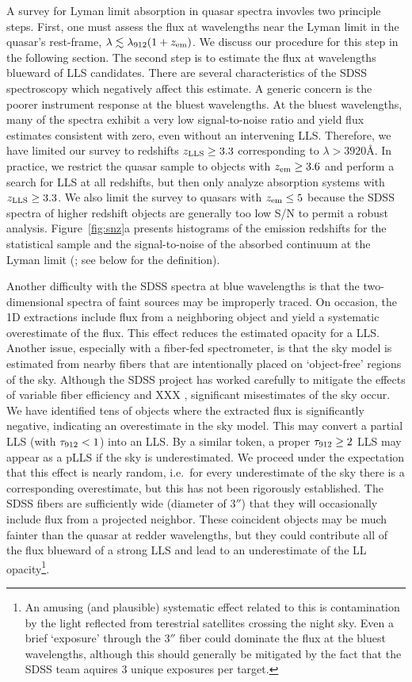 \documentclass[12pt,preprint]{aastex}
\begin{document}
A survey for  Lyman limit absorption in quasar spectra
invovles two principle steps.  First, one must assess
the flux at wavelengths near the Lyman limit
in the quasar's rest-frame, $\lambda \lesssim \lambda_{\rm 912}(1+z_{\rm em})$.  
We discuss our procedure for this step in the following section.  
The second step is to 
estimate the flux at wavelengths blueward of LLS candidates.
There are several characteristics of the SDSS spectroscopy which
negatively affect this estimate.  A generic concern is the poorer instrument
response at the bluest wavelengths.  At the bluest wavelengths,
many of the spectra exhibit a very low signal-to-noise ratio 
and yield flux estimates consistent with zero, even without an
intervening LLS.
Therefore, we have limited our survey to redshifts $z_{\rm LLS} \ge 3.3$
corresponding to $\lambda > 3920$\AA.
In practice, we restrict the quasar sample to objects with
$z_{\rm em} \ge 3.6$ and perform a search for LLS
at all redshifts, but then only analyze absorption systems with
$z_{\rm LLS} \ge 3.3$.  We also limit the survey to quasars with
$z_{\rm em} \le 5$ because the SDSS spectra of higher redshift objects
are generally too low S/N to permit a robust analysis.
Figure~\ref{fig:snz}a presents histograms of the emission redshifts
for the statistical sample and the signal-to-noise of the
absorbed continuum at the Lyman limit
(\sna; see below for the definition).


Another difficulty with the SDSS spectra at blue wavelengths
is that the two-dimensional spectra of faint sources may be improperly traced.
On occasion, the 1D extractions
include flux from a neighboring object and yield a systematic 
overestimate of the flux.  This effect reduces the estimated opacity
for a LLS.  
Another issue, especially with a fiber-fed spectrometer, is that
the sky model is estimated from nearby fibers that are intentionally
placed on `object-free' regions of the sky.  Although the SDSS
project has worked carefully to mitigate the effects of variable
fiber efficiency and XXX \cite{skysub},  significant misestimates 
of the sky occur.  
We have identified tens of objects where the extracted
flux is significantly negative, indicating an overestimate
in the sky model.  
This may convert a partial LLS (with $\tau_{\rm 912} < 1$) into
an LLS.  By a similar token, a proper $\tau_{\rm 912} \ge 2$ LLS may
appear as a pLLS if the sky is underestimated.
We proceed under the expectation that this effect
is nearly random, i.e.\ for every underestimate of the sky there
is a corresponding overestimate, but this has not been rigorously
established.  
The SDSS fibers are sufficiently wide
(diameter of $3''$) that they will occasionally include flux
from a projected neighbor.  These coincident objects may be
much fainter than the quasar at redder wavelengths, but they
could contribute all of the flux blueward of a strong LLS
and lead to an underestimate of the LL opacity\footnote{An amusing
(and plausible) systematic effect related to this is contamination
by the light reflected from terestrial satellites crossing the night sky.  
Even a brief `exposure' through the 3$''$ fiber could dominate the
flux at the bluest wavelengths, although this should generally be
mitigated by the fact that the SDSS team aquires 
3 unique exposures per target.}.
\end{document}
